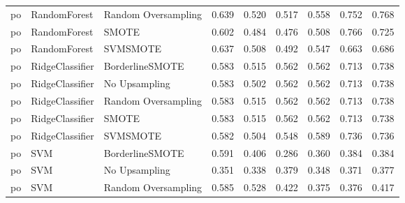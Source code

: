 \begin{tabular}{lllllllll}
      po &                 RandomForest & Random Oversampling & 0.639 &                     0.520 &                 0.517 &                  0.558 &                                   0.752 &     0.768 \\
      po &                 RandomForest &               SMOTE & 0.602 &                     0.484 &                 0.476 &                  0.508 &                                   0.766 &     0.725 \\
      po &                 RandomForest &            SVMSMOTE & 0.637 &                     0.508 &                 0.492 &                  0.547 &                                   0.663 &     0.686 \\
      po &              RidgeClassifier &     BorderlineSMOTE & 0.583 &                     0.515 &                 0.562 &                  0.562 &                                   0.713 &     0.738 \\
      po &              RidgeClassifier &       No Upsampling & 0.583 &                     0.502 &                 0.562 &                  0.562 &                                   0.713 &     0.738 \\
      po &              RidgeClassifier & Random Oversampling & 0.583 &                     0.515 &                 0.562 &                  0.562 &                                   0.713 &     0.738 \\
      po &              RidgeClassifier &               SMOTE & 0.583 &                     0.515 &                 0.562 &                  0.562 &                                   0.713 &     0.738 \\
      po &              RidgeClassifier &            SVMSMOTE & 0.582 &                     0.504 &                 0.548 &                  0.589 &                                   0.736 &     0.736 \\
      po &                          SVM &     BorderlineSMOTE & 0.591 &                     0.406 &                 0.286 &                  0.360 &                                   0.384 &     0.384 \\
      po &                          SVM &       No Upsampling & 0.351 &                     0.338 &                 0.379 &                  0.348 &                                   0.371 &     0.377 \\
      po &                          SVM & Random Oversampling & 0.585 &                     0.528 &                 0.422 &                  0.375 &                                   0.376 &     0.417 \\

\end{tabular}
